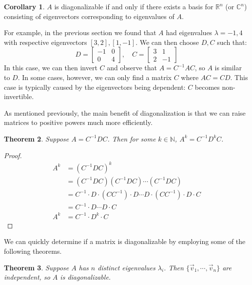 \documentclass[11pt]{amsart}
\newtheorem{theorem}{Theorem}[section]
\theoremstyle{definition}
\newtheorem{corollary}[theorem]{Corollary}
\newcommand{\complexNumbers}{\mathbb{C}}
\newcommand{\reals}{\mathbb{R}}
\newcommand{\naturals}{\mathbb{N}}
\begin{document}
\begin{corollary}
	$A$ is diagonalizable if and only if there exists a basis for $\reals^n$ (or $\complexNumbers^n$) consisting of eigenvectors corresponding
	to eigenvalues of $A$.
\end{corollary}
For example, in the previous section we found that $A$ had eigenvalues $\lambda = -1, 4$ with respective eigenvectors
$[3, 2], [1, -1]$. We can then choose $D, C$ such that:
\[
	D = \begin{bmatrix} -1 & 0 \\ 0 & 4 \end{bmatrix}, \quad C = \begin{bmatrix} 3 & 1 \\ 2 & -1 \end{bmatrix}
\]
In this case, we can then invert $C$ and observe that $A = C^{-1}AC$, so $A$ is similar to $D$. In some cases, however, we can only find
a matrix $C$ where $AC = CD$. This case is typically caused by the eigenvectors being dependent: $C$ becomes non-invertible.

\newpage
As mentioned previously, the main benefit of diagonalization is that we can raise matrices to positive powers much more efficiently.
\begin{theorem}
	Suppose $A = C^{-1}DC$. Then for some $k \in \naturals$, $A^k = C^{-1}D^kC$.
\end{theorem}
\begin{proof}
	\begin{align*}
		A^k &= (C^{-1}DC)^k \\
		&= (C^{-1}DC)(C^{-1}DC) \cdots (C^{-1}DC) \\
		&= C^{-1} \cdot D \cdot (CC^{-1}) \cdot D \cdots D \cdot (CC^{-1}) \cdot D \cdot C \\
		&= C^{-1} \cdot D \cdots D \cdot C \\
		A^k &= C^{-1} \cdot D^k \cdot C
	\end{align*}
\end{proof}
We can quickly determine if a matrix is diagonalizable by employing some of the following theorems.
\begin{theorem}
	Suppose $A$ has $n$ distinct eigenvalues $\lambda_i$. Then $\{ \vec{v}_1, \cdots, \vec{v}_n \}$ are independent, so $A$ is
	diagonalizable.
\end{theorem}
\end{document}
